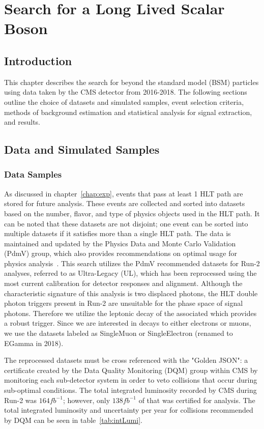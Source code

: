 
\chapter{Search for a Long Lived Scalar Boson}
\section{Introduction} \label{sec:ana_intro}
This chapter describes the search for beyond the standard model (BSM) particles using data taken by the CMS detector from 2016-2018. The following sections outline the choice of datasets and simulated samples, event selection criteria, methods of background estimation and statistical analysis for signal extraction, and results.

\section{Data and Simulated Samples} \label{sec:ana_samples}

\subsection{Data Samples} \label{sec:ana_data}
As discussed in chapter~\ref{chap:exp}, events that pass at least 1 HLT path are stored for future analysis. These events are collected and sorted into datasets based on the number, flavor, and type of physics objects used in the HLT path. It can be noted that these datasets are not disjoint; one event can be sorted into multiple datasets if it satisfies more than a single HLT path. The data is maintained and updated by the Physics Data and Monte Carlo Validation (PdmV) group, which also provides recommendations on optimal usage for physics analysis~\cite{pdmv}. This search utilizes the PdmV recommended datasets for Run-2 analyses, referred to as Ultra-Legacy (UL), which has been reprocessed using the most current calibration for detector responses and alignment. Although the characteristic signature of this analysis is two displaced photons, the HLT double photon triggers present in Run-2 are unsuitable for the phase space of signal photons. Therefore we utilize the leptonic decay of the associated \VZ which provides a robust trigger. Since we are interested in \VZ decays to either electrons or muons, we use the datasets labeled as SingleMuon or SingleElectron (renamed to EGamma in 2018).

The reprocessed datasets must be cross referenced with the "Golden JSON": a certificate created by the Data Quality Monitoring (DQM) group within CMS by monitoring each sub-detector system in order to veto collisions that occur during sub-optimal conditions. The total integrated luminosity recorded by CMS during Run-2 was $164\unit{fb^{-1}}$; however, only $138\unit{fb^{-1}}$ of that was certified for analysis. The total integrated luminosity and uncertainty per year for collisions recommended by DQM can be seen in table~\ref{tab:intLumi}.

